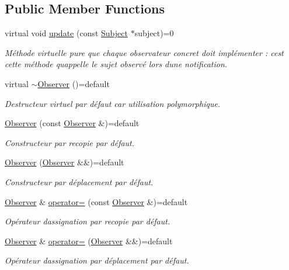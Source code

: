 \subsection*{Public Member Functions}
\begin{DoxyCompactItemize}
\item 
virtual void \mbox{\hyperlink{classnvs_1_1_observer_a4c0373c644180bdc48558e5248968b3a}{update}} (const \mbox{\hyperlink{classnvs_1_1_subject}{Subject}} $\ast$subject)=0
\begin{DoxyCompactList}\small\item\em Méthode virtuelle pure que chaque observateur concret doit implémenter \+: c\textquotesingle{}est cette méthode qu\textquotesingle{}appelle le sujet observé lors d\textquotesingle{}une notification. \end{DoxyCompactList}\item 
\mbox{\label{classnvs_1_1_observer_aad2df366134bc340a8717360cd7307d2}} 
virtual \mbox{\hyperlink{classnvs_1_1_observer_aad2df366134bc340a8717360cd7307d2}{$\sim$\+Observer}} ()=default
\begin{DoxyCompactList}\small\item\em Destructeur virtuel par défaut car utilisation polymorphique. \end{DoxyCompactList}\item 
\mbox{\hyperlink{classnvs_1_1_observer_a4515f485c0ca822e088cffdfc30d3ed8}{Observer}} (const \mbox{\hyperlink{classnvs_1_1_observer}{Observer}} \&)=default
\begin{DoxyCompactList}\small\item\em Constructeur par recopie par défaut. \end{DoxyCompactList}\item 
\mbox{\hyperlink{classnvs_1_1_observer_a3058c1a0d319e92a563a6ed09354e8f6}{Observer}} (\mbox{\hyperlink{classnvs_1_1_observer}{Observer}} \&\&)=default
\begin{DoxyCompactList}\small\item\em Constructeur par déplacement par défaut. \end{DoxyCompactList}\item 
\mbox{\hyperlink{classnvs_1_1_observer}{Observer}} \& \mbox{\hyperlink{classnvs_1_1_observer_a405218b4689360fb9d8fdab3bed37dad}{operator=}} (const \mbox{\hyperlink{classnvs_1_1_observer}{Observer}} \&)=default
\begin{DoxyCompactList}\small\item\em Opérateur d\textquotesingle{}assignation par recopie par défaut. \end{DoxyCompactList}\item 
\mbox{\hyperlink{classnvs_1_1_observer}{Observer}} \& \mbox{\hyperlink{classnvs_1_1_observer_a12803c6d97f98c355a0f46b36a35d64b}{operator=}} (\mbox{\hyperlink{classnvs_1_1_observer}{Observer}} \&\&)=default
\begin{DoxyCompactList}\small\item\em Opérateur d\textquotesingle{}assignation par déplacement par défaut. \end{DoxyCompactList}\end{DoxyCompactItemize}
